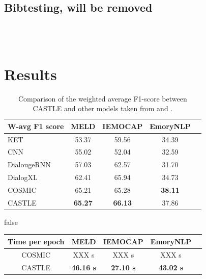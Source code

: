 \documentclass[nofilelist]{cslthse-msc}
\begin{document}
\section{Bibtesting, will be removed}
\citep{emotionlinesdataset} \\
\citep{franoischollet2017learning}\\
\citep{beaver2020towards}

\fi

\chapter{Results}


\begin{table}[h!]
\begin{center}
\begin{tabular}{lcccc}
\hline
\textbf{W-avg F1 score} & \textbf{MELD}           & \textbf{IEMOCAP}        & \textbf{EmoryNLP}  \\ \hline
KET                     & 53.37           & 59.56          & 34.39 \\
CNN                     & 55.02           & 52.04          & 32.59 \\
DialougeRNN             & 57.03           & 62.57          & 31.70 \\
DialogXL                & 62.41           & 65.94          & 34.73 \\
COSMIC                  & 65.21           & 65.28          & \textbf{38.11} \\ \hline
CASTLE                  & \textbf{65.27} & \textbf{66.13} & 37.86\\ \hline
\end{tabular}
\end{center}
\caption{Comparison of the weighted average F1-score between CASTLE and other models taken from \citet{ghosal2020cosmic} and \citet{Shen2020DialogXLAX}.}
\end{table}




\ifx false
\begin{table}[h!]
\begin{tabular}{|c|c|c|c|c|}
\hline
Time per epoch & MELD             & IEMOCAP          & EmoryNLP          \\ \hline
COSMIC         & XXX s            & XXX s          & XXX s                  \\ \hline
CASTLE         & \textbf{46.16 s} & \textbf{27.10 s} & \textbf{43.02 s}       \\ \hline
\end{tabular}
\end{table}
\fi
\end{document}

